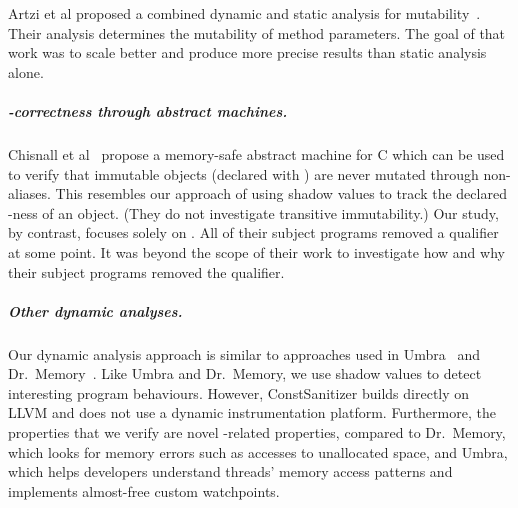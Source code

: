 Artzi et al proposed a combined dynamic and static analysis for
mutability~\cite{ase-2007-p104-artzi}.
Their analysis determines the mutability of method parameters.
The goal of that work was to scale better and produce more precise results than
static analysis alone.

\subparagraph*{\const{}-correctness through abstract machines.}

Chisnall et al~\cite{asplos-2015-chisnall-p117} propose a memory-safe abstract
machine for C which can be used to verify that immutable objects
(declared with \const{}) are never mutated through non-\const{} aliases.
This resembles our approach of using shadow values to track the declared
\const{}-ness of an object.
(They do not investigate transitive immutability.)
Our study, by contrast, focuses solely on \wstc.
All of their subject programs removed a \const{} qualifier at
some point.
It was beyond the scope of their work to investigate how and why their subject programs
removed the \const{} qualifier.

\subparagraph*{Other dynamic analyses.}

Our dynamic analysis approach is similar to approaches used in
Umbra~\cite{2010-cc-zhao} and Dr.~Memory~\cite{2011-cgo-bruening}.
Like Umbra and Dr.~Memory, we use shadow values to detect interesting
program behaviours.
However, ConstSanitizer builds directly on LLVM and does not use a
dynamic instrumentation platform.
Furthermore, the properties that we verify are novel \const{}-related
properties, compared to Dr.~Memory, which looks for memory errors such
as accesses to unallocated space, and Umbra, which helps developers understand
threads' memory access patterns and implements almost-free custom watchpoints.
